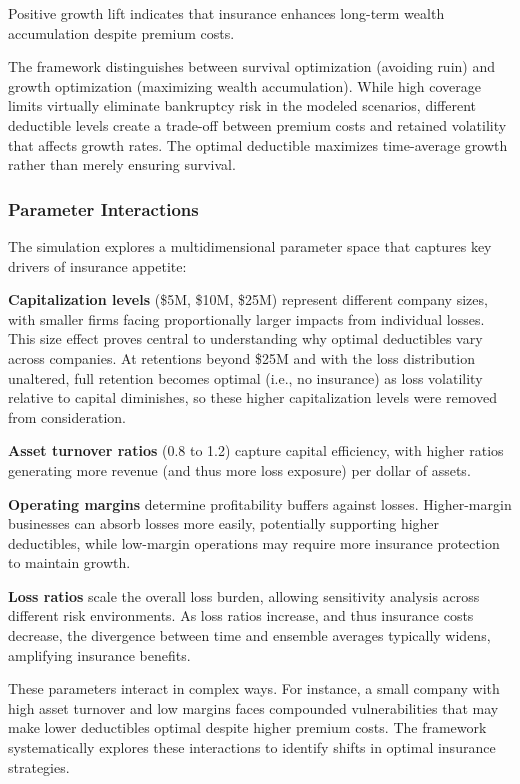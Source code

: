 \documentclass[11pt,letterpaper]{article}
\begin{document}
Positive growth lift indicates that insurance enhances long-term wealth accumulation despite premium costs.

The framework distinguishes between survival optimization (avoiding ruin) and growth optimization (maximizing wealth accumulation). While high coverage limits virtually eliminate bankruptcy risk in the modeled scenarios, different deductible levels create a trade-off between premium costs and retained volatility that affects growth rates. The optimal deductible maximizes time-average growth rather than merely ensuring survival.

\subsubsection{Parameter Interactions}

The simulation explores a multidimensional parameter space that captures key drivers of insurance appetite:

\textbf{Capitalization levels} (\$5M, \$10M, \$25M) represent different company sizes, with smaller firms facing proportionally larger impacts from individual losses. This size effect proves central to understanding why optimal deductibles vary across companies. At retentions beyond \$25M and with the loss distribution unaltered, full retention becomes optimal (i.e., no insurance) as loss volatility relative to capital diminishes, so these higher capitalization levels were removed from consideration.

\textbf{Asset turnover ratios} (0.8 to 1.2) capture capital efficiency, with higher ratios generating more revenue (and thus more loss exposure) per dollar of assets.

\textbf{Operating margins} determine profitability buffers against losses. Higher-margin businesses can absorb losses more easily, potentially supporting higher deductibles, while low-margin operations may require more insurance protection to maintain growth.

\textbf{Loss ratios} scale the overall loss burden, allowing sensitivity analysis across different risk environments. As loss ratios increase, and thus insurance costs decrease, the divergence between time and ensemble averages typically widens, amplifying insurance benefits.

These parameters interact in complex ways. For instance, a small company with high asset turnover and low margins faces compounded vulnerabilities that may make lower deductibles optimal despite higher premium costs. The framework systematically explores these interactions to identify shifts in optimal insurance strategies.
\end{document}
